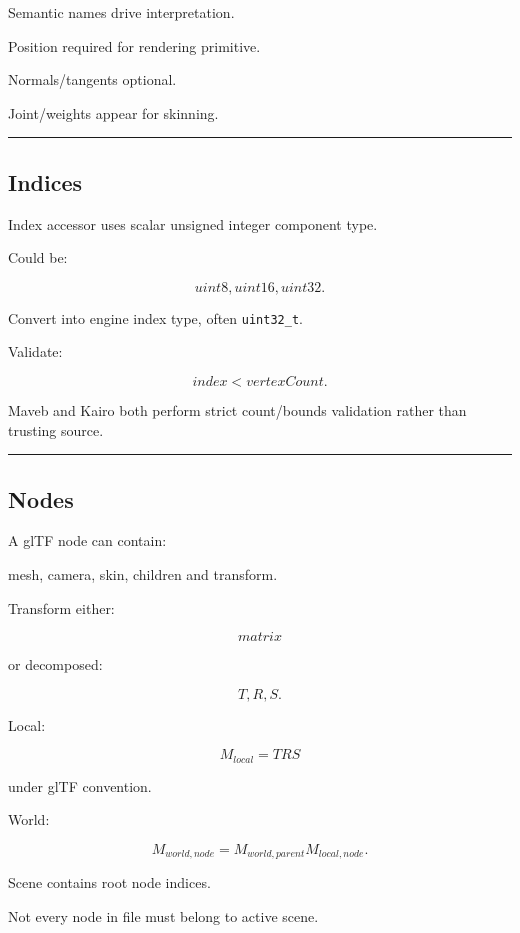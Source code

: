 Semantic names drive interpretation.

Position required for rendering primitive.

Normals/tangents optional.

Joint/weights appear for skinning.

\begin{center}\rule{0.5\linewidth}{0.5pt}\end{center}

\subsection{Indices}\label{04-visual-computing-ii-ch041-indices}

Index accessor uses scalar unsigned integer component type.

Could be:

\[
uint8,uint16,uint32.
\]

Convert into engine index type, often \texttt{uint32\_t}.

Validate:

\[
index<vertexCount.
\]

Maveb and Kairo both perform strict count/bounds validation rather than trusting source.

\begin{center}\rule{0.5\linewidth}{0.5pt}\end{center}

\subsection{Nodes}\label{04-visual-computing-ii-ch041-nodes}

A glTF node can contain:

mesh, camera, skin, children and transform.

Transform either:

\[
matrix
\]

or decomposed:

\[
T,R,S.
\]

Local:

\[
M_{local}
=
T
R
S
\]

under glTF convention.

World:

\[
\boxed{
M_{world,node}
=
M_{world,parent}
M_{local,node}.
}
\]

Scene contains root node indices.

Not every node in file must belong to active scene.


